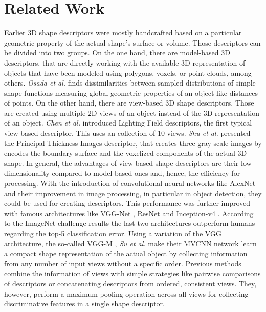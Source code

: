 \chapter{Related Work}
\label{sec:related-work}
Earlier 3D shape descriptors were mostly handcrafted based on a particular geometric property of the actual shape's surface or volume.
Those descriptors can be divided into two groups.
On the one hand, there are model-based 3D descriptors, that are directly working with the available 3D representation of objects that have been modeled using polygons, voxels, or point clouds, among others.
\textit{Osada et al.} \cite{Osada:2001:MMS:882486.884103} finds dissimilarities between sampled distributions of simple shape functions measuring global geometric properties of an object like distances of points.
On the other hand, there are view-based 3D shape descriptors.
Those are created using multiple 2D views of an object instead of the 3D representation of an object.
\textit{Chen et al.} \cite{Chen2003} introduced Lighting Field descriptors, the first typical view-based descriptor.
This uses an collection of 10 views.
\textit{Shu et al.} \cite{Shu:2016:MCV:2965260.2965467} presented the Principal Thickness Images descriptor, that creates three gray-scale images by encodes the boundary surface and the voxelized components of the actual 3D shape.
In general, the advantages of view-based shape descriptors are their low dimensionality compared to model-based ones and, hence, the efficiency for processing.
With the introduction of convolutional neural networks like AlexNet \cite{Krizhevsky:2012:ICD:2999134.2999257} and their improvement in image processing, in particular in object detection, they could be used for creating descriptors.
This performance was further improved with famous architectures like VGG-Net \cite{Simonyan15}, ResNet \cite{He2016ResNet} and Inception-v4 \cite{SzegedyInceptionv4}.
According to the ImageNet \cite{Russakovsky:2015:ILS:2846547.2846559} challenge results the last two architectures outperform humans regarding the top-5 classification error.
Using a variation of the VGG architecture, the so-called VGG-M \cite{journals/corr/ChatfieldSVZ14}, \textit{Su et al.} \cite{Su:2015:MCN:2919332.2919750} make their MVCNN network learn a compact shape representation of the actual object by collecting information from any number of input views without a specific order.
Previous methods combine the information of views with simple strategies like pairwise comparisons of descriptors or concatenating descriptors from ordered, consistent views.
They, however, perform a maximum pooling operation across all views for collecting discriminative features in a single shape descriptor.
